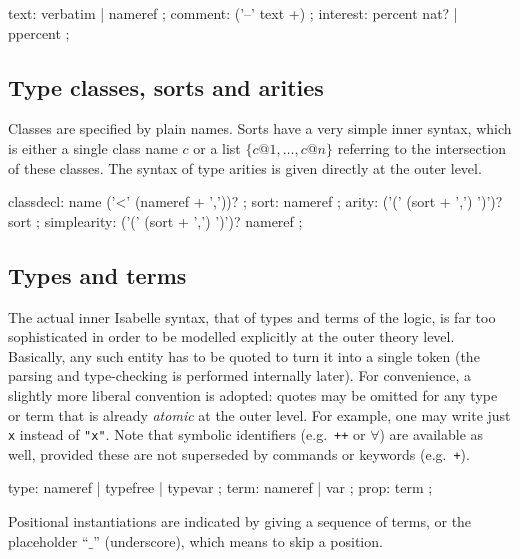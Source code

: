 \begin{rail}
  text: verbatim | nameref
  ;
  comment: ('--' text +)
  ;
  interest: percent nat? | ppercent
  ;
\end{rail}


\subsection{Type classes, sorts and arities}

Classes are specified by plain names.  Sorts have a very simple inner syntax,
which is either a single class name $c$ or a list $\{c@1, \dots, c@n\}$
referring to the intersection of these classes.  The syntax of type arities is
given directly at the outer level.

\begin{rail}
  classdecl: name ('<' (nameref + ','))?
  ;
  sort: nameref
  ;
  arity: ('(' (sort + ',') ')')? sort
  ;
  simplearity: ('(' (sort + ',') ')')? nameref
  ;
\end{rail}


\subsection{Types and terms}\label{sec:types-terms}

The actual inner Isabelle syntax, that of types and terms of the logic, is far
too sophisticated in order to be modelled explicitly at the outer theory
level.  Basically, any such entity has to be quoted to turn it into a single
token (the parsing and type-checking is performed internally later).  For
convenience, a slightly more liberal convention is adopted: quotes may be
omitted for any type or term that is already \emph{atomic} at the outer level.
For example, one may write just \texttt{x} instead of \texttt{"x"}.  Note that
symbolic identifiers (e.g.\ \texttt{++} or $\forall$) are available as well,
provided these are not superseded by commands or keywords (e.g.\ \texttt{+}).

\begin{rail}
  type: nameref | typefree | typevar
  ;
  term: nameref | var
  ;
  prop: term
  ;
\end{rail}

Positional instantiations are indicated by giving a sequence of terms, or the
placeholder ``$\_$'' (underscore), which means to skip a position.

